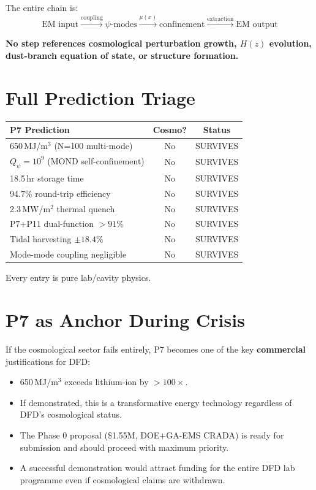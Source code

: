 \documentclass[11pt]{article}
\begin{document}
The entire chain is:
\[
\text{EM input} \xrightarrow{\text{coupling}} \psi\text{-modes}
\xrightarrow{\mu(x)} \text{confinement}
\xrightarrow{\text{extraction}} \text{EM output}
\]

\textbf{No step references cosmological perturbation growth, $H(z)$
evolution, dust-branch equation of state, or structure formation.}

\section{Full Prediction Triage}

\begin{table}[h]
\centering
\begin{tabular}{lcc}
\toprule
\textbf{P7 Prediction} & \textbf{Cosmo?} & \textbf{Status} \\
\midrule
650\,MJ/m$^3$ (N=100 multi-mode) & No & SURVIVES \\
$Q_\psi = 10^9$ (MOND self-confinement) & No & SURVIVES \\
18.5\,hr storage time & No & SURVIVES \\
94.7\% round-trip efficiency & No & SURVIVES \\
2.3\,MW/m$^2$ thermal quench & No & SURVIVES \\
P7+P11 dual-function $>91\%$ & No & SURVIVES \\
Tidal harvesting $\pm 18.4\%$ & No & SURVIVES \\
Mode-mode coupling negligible & No & SURVIVES \\
\bottomrule
\end{tabular}
\end{table}

Every entry is pure lab/cavity physics.

\section{P7 as Anchor During Crisis}

If the cosmological sector fails entirely, P7 becomes one of the key
\textbf{commercial} justifications for DFD:

\begin{itemize}
\item 650\,MJ/m$^3$ exceeds lithium-ion by $>100\times$.
\item If demonstrated, this is a transformative energy technology
  regardless of DFD's cosmological status.
\item The Phase 0 proposal (\$1.55M, DOE+GA-EMS CRADA) is ready
  for submission and should proceed with maximum priority.
\item A successful demonstration would attract funding for the
  entire DFD lab programme even if cosmological claims are withdrawn.
\end{itemize}
\end{document}
